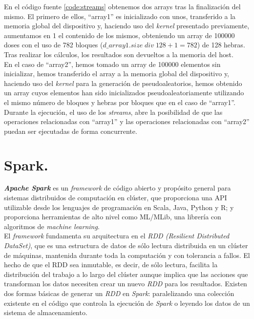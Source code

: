 En el código fuente \ref{code:streams} obtenemos dos arrays tras la finalización del mismo. El primero de ellos, ``array1'' es inicializado con unos, transferido a la memoria global del dispositivo y, haciendo uso del \textit{kernel} presentado previamente, aumentamos en 1 el contenido de los mismos, obteniendo un array de 100000 doses con el uso de 782 bloques ($d\_array1.size \;div \;128 + 1 = 782$) de 128 hebras. Tras realizar los cálculos, los resultados son devueltos a la memoria del host.\\

En el caso de ``array2'', hemos tomado un array de 100000 elementos sin inicializar, hemos transferido el array a la memoria global del dispositivo y, haciendo uso del \textit{kernel} para la generación de pseudoaleatorios, hemos obtenido un array cuyos elementos han sido inicializados pseudoaleatoriamente utilizando el mismo número de bloques y hebras por bloques que en el caso de ``array1''. Durante la ejecución, el uso de los \textit{streams}, abre la posibilidad de que las operaciones relacionadas con ``array1'' y las operaciones relacionadas con ``array2'' puedan ser ejecutadas de forma concurrente.
\section{Spark.}



\textbf{\textit{Apache Spark}} es un \textit{framework} de código abierto y propósito general para sistemas distribuidos de computación en clúster, que proporciona una API utilizable desde los lenguajes de programación en Scala, Java, Python y R; y proporciona herramientas de alto nivel como ML/MLib, una librería con algoritmos de \textit{machine learning}. \\

El \textit{framework} fundamenta su arquitectura en el \textit{RDD (Resilient Distributed DataSet)}, que es una estructura de datos de sólo lectura distribuida en un clúster de máquinas, mantenida durante toda la computación y con tolerancia a fallos. El hecho de que el RDD sea inmutable, es decir, de sólo lectura, facilita la distribución del trabajo a lo largo del clúster aunque implica que las acciones que transforman los datos necesiten crear un nuevo \textit{RDD} para los resultados. Existen dos formas básicas de generar un \textit{RDD} en \textit{Spark}: paralelizando una colección existente en el código que controla la ejecución de \textit{Spark} o leyendo los datos de un sistema de almacenamiento. \\

